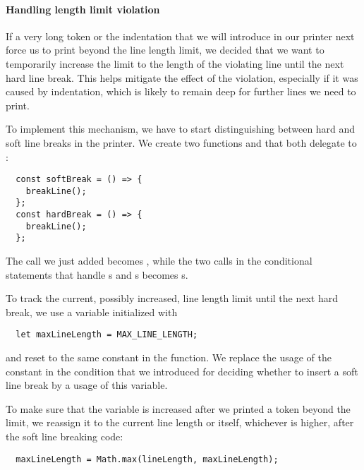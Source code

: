 \paragraph{Handling length limit violation}
If a very long token or the indentation
that we will introduce in our printer next
force us to print beyond the line length limit,
we decided that we want to temporarily increase
the limit to the length of the violating line
until the next hard line break.
This helps mitigate the effect of the violation,
especially if it was caused by indentation,
which is likely to remain deep
for further lines we need to print.

To implement this mechanism,
we have to start distinguishing between
hard and soft line breaks in the printer.
We create two functions
 and 
that both delegate to :
\begin{verbatim}
  const softBreak = () => {
    breakLine();
  };
  const hardBreak = () => {
    breakLine();
  };
\end{verbatim}
The  call we just added
becomes , while
the two calls in the conditional statements
that handle s and s
becomes s.

To track the current, possibly increased, line length limit
until the next hard break, we use a variable initialized with
\begin{verbatim}
  let maxLineLength = MAX_LINE_LENGTH;
\end{verbatim}
and reset to the same constant in the  function.
We replace the usage of the constant in the condition
that we introduced for deciding whether to insert a soft line break
by a usage of this variable.

To make sure that the variable is increased
after we printed a token beyond the limit,
we reassign it to the current line length or itself,
whichever is higher, after the soft line breaking code:
\begin{verbatim}
  maxLineLength = Math.max(lineLength, maxLineLength);
\end{verbatim}
